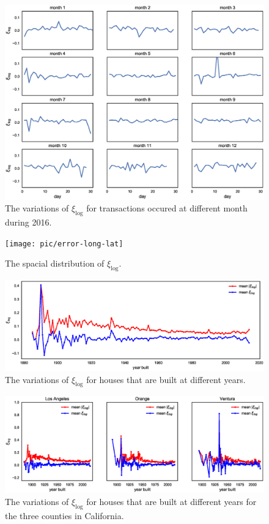 \documentclass[12pt]{article}
\begin{document}
\begin{figure}[!ht]
	\centering
	\includegraphics[width=0.9\linewidth]{pic/error-variation-different-month}
	\caption{The variations of $\xi_{\log}$ for transactions occured at different month during 2016.}
	\label{fig:error-variation-different-month}
\end{figure}

\begin{figure}[!ht]
	\centering
	\texttt{[image: pic/error-long-lat]}
	\caption{The spacial distribution of $\xi_{\log}$.}
	\label{fig:error-long-lat}
\end{figure}

\begin{figure}[!ht]
	\centering
	\includegraphics[width=0.85\linewidth]{pic/total-error-yearbuilt}
	\caption{The variations of $\xi_{\log}$ for houses that are built at different years.}
	\label{fig:total-error-yearbuilt}
\end{figure}

\begin{figure}[!ht]
	\centering
	\includegraphics[width=1\linewidth]{pic/diff-location-error-yearbuild}
	\caption{The variations of $\xi_{\log}$ for houses that are built at different years for the three counties in California.}
	\label{fig:diff-location-error-yearbuild}
\end{figure}
\end{document}
